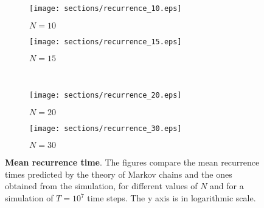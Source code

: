 \begin{figure}
  \begin{subfigure}{.5\textwidth}
      \centering
      \texttt{[image: sections/recurrence\_10.eps]}
      \caption{$N = 10$}
    \end{subfigure}
    \begin{subfigure}{.5\textwidth}
      \centering
      \texttt{[image: sections/recurrence\_15.eps]}
      \caption{$N = 15$}
    \end{subfigure}\\
    \begin{subfigure}{0.5\textwidth}
      \centering
      \texttt{[image: sections/recurrence\_20.eps]}
      \caption{$N = 20$}
    \end{subfigure}%
    \begin{subfigure}{0.5\textwidth}
      \centering
      \texttt{[image: sections/recurrence\_30.eps]}
      \caption{$N = 30$}
    \end{subfigure}%

  \captionsetup{width=.9\linewidth}
  \caption{\textbf{Mean recurrence time}. The figures  compare the mean recurrence times predicted by the theory of Markov chains and the ones obtained from the simulation, for different values of $N$ and for a simulation of $T= 10^7$ time steps. The y axis is in logarithmic scale.}
  \label{fig:recurrence}
\end{figure}



